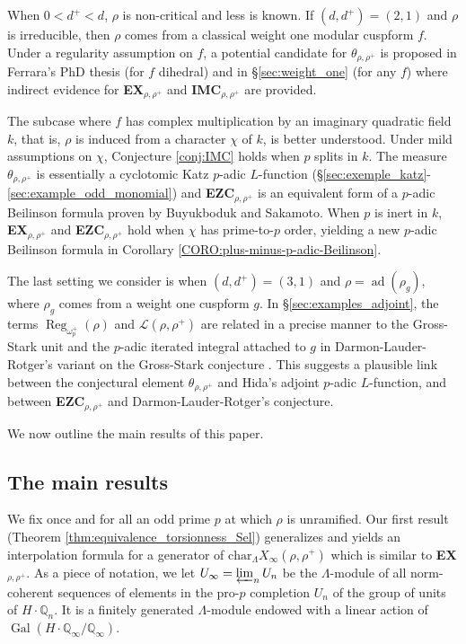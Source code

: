\documentclass[12pt]{amsart}
\newcommand\bQ{\mathbb{Q}}
\newcommand\cL{\mathcal{L}}
\renewcommand{\char}{\textrm{char}}
\DeclareMathOperator{\Gal}{Gal}
\DeclareMathOperator{\ad}{ad}
\DeclareMathOperator{\Reg}{Reg}
\theoremstyle{defstyle}
\theoremstyle{thmstyle}
\begin{document}
When $0<d^+<d$, $\rho$ is non-critical and less is known. If $(d,d^+)=(2,1)$ and $\rho$ is irreducible, then $\rho$ comes from a classical weight one modular cuspform $f$. Under a regularity assumption on $f$, a potential candidate for $\theta_{\rho,\rho^+}$ is proposed in Ferrara's PhD thesis \cite{ferrara} (for $f$ dihedral) and in \S\ref{sec:weight_one} (for any $f$) where indirect evidence for \textbf{EX}\(_{\rho,\rho^+}\) and \textbf{IMC}\(_{\rho,\rho^+}\) are provided. 

The subcase where $f$ has complex multiplication by an imaginary quadratic field $k$, that is, $\rho$ is induced from a character $\chi$ of $k$, is better understood. Under mild assumptions on $\chi$, Conjecture \ref{conj:IMC} holds when $p$ splits in $k$. The measure $\theta_{\rho,\rho^+}$ is essentially a cyclotomic Katz $p$-adic $L$-function (\S\ref{sec:exemple_katz}-\ref{sec:example_odd_monomial}) and \textbf{EZC}$_{\rho,\rho^+}$ is an equivalent form of a $p$-adic Beilinson formula proven by Buyukboduk and Sakamoto. When $p$ is inert in $k$, \textbf{EX}$_{\rho,\rho^+}$ and \textbf{EZC}$_{\rho,\rho^+}$ hold when $\chi$ has prime-to-$p$ order, yielding a new $p$-adic Beilinson formula in Corollary \ref{CORO:plus-minus-p-adic-Beilinson}.

The last setting we consider is when $(d,d^+)=(3,1)$ and $\rho=\ad(\rho_g)$, where $\rho_g$ comes from a weight one cuspform $g$. In \S\ref{sec:examples_adjoint}, the terms $\Reg_{{\omega}^+_{p}}(\rho)$ and $\cL(\rho,\rho^+)$ are related in a precise manner to the Gross-Stark unit and the $p$-adic iterated integral attached to $g$ in Darmon-Lauder-Rotger's variant on the Gross-Stark conjecture \cite{DLR2}. This suggests a plausible link between the conjectural element $\theta_{\rho,\rho^+}$ and Hida's adjoint $p$-adic $L$-function, and between \textbf{EZC}$_{\rho,\rho^+}$ and Darmon-Lauder-Rotger's conjecture.

We now outline the main results of this paper.

\subsection{The main results}
We fix once and for all an odd prime $p$ at which $\rho$ is unramified. Our first result (Theorem \ref{thm:equivalence_torsionness_Sel}) generalizes \cite[Théorème A]{maks} and yields an interpolation formula for a generator of $\char_\Lambda X_\infty(\rho,\rho^+)$ which is similar to \textbf{EX}$_{\rho,\rho^+}$. As a piece of notation, we let $U_\infty=\varprojlim_n U_n$ be the $\Lambda$-module of all norm-coherent sequences of elements in the pro-$p$ completion $U_n$ of the group of units of $H\cdot \bQ_n$. It is a finitely generated $\Lambda$-module endowed with a linear action of $\Gal(H\cdot \bQ_\infty /\bQ_\infty)$.
\end{document}
